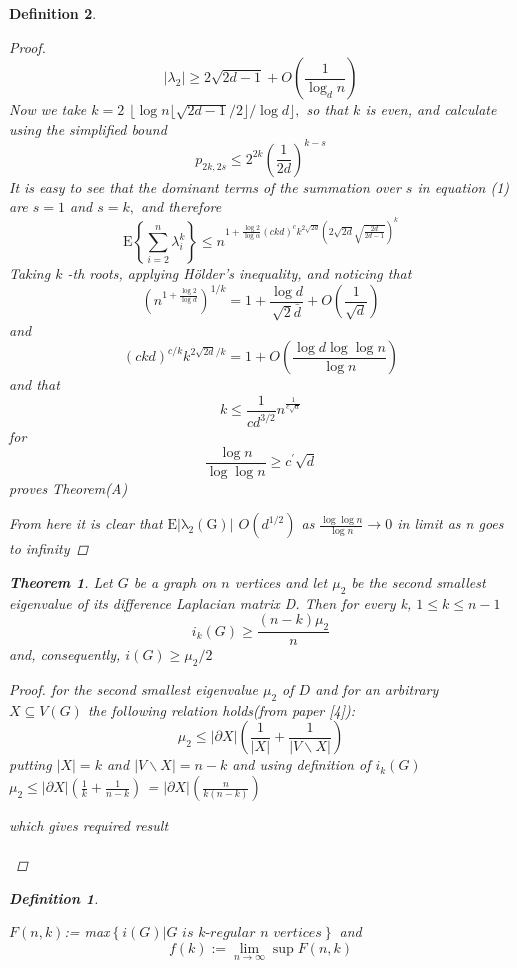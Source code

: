 \documentclass[oneside]{book}
\newtheorem{theorem}{Theorem}[section]
\newtheorem{mydef}{Definition}
\begin{document}
\begin{mydef}
\begin{proof}
$$
\left|\lambda_{2}\right| \geq 2 \sqrt{2 d-1}+O\left(\frac{1}{\log _{d} n}\right)
$$
Now we take $k=2$ $\lfloor\log n\lfloor\sqrt{2 d-1} / 2\rfloor / \log d\rfloor,$ so that $k$ is even, and calculate
using the simplified bound
$$
p_{2 k, 2 s} \leq 2^{2 k}\left(\frac{1}{2 d}\right)^{k-s}
$$
It is easy to see that the dominant terms of the summation over $s$ in equation (1) are $s=1$ and $s=k,$ and therefore
$$
\mathrm{E}\left\{\sum_{i=2}^{n} \lambda_{i}^{k}\right\} \leq n^{1+\frac{\log 2}{\log \alpha}(c k d)^{c} k^{2 \sqrt{2 d}}(2 \sqrt{2 d} \sqrt{\frac{2 d}{2 d-1}})^{k}}
$$
Taking $k$ -th roots, applying Hölder's  inequality, and noticing that
$$
\left(n^{1+\frac{\log 2}{\log d}}\right)^{1 / k}=1+\frac{\log d}{\sqrt{2} \bar{d}}+O\left(\frac{1}{\sqrt{d}}\right)
$$
and 
$$
(c k d)^{c / k} k^{2 \sqrt{2 d} / k}=1+O\left(\frac{\log d \log \log n}{\log n}\right)
$$
and that
$$
k \leq \frac{1}{c d^{3 / 2}} n^{\frac{1}{c \sqrt{a}}}
$$
for
$$
\frac{\log n}{\log \log n} \geq c^{\prime} \sqrt{d}
$$
proves Theorem(A)  \par 
From here it is clear that $\mathrm{E|\lambda_{2}(G)|}$ \leq $O(d^{1/2})$ as $\frac{ \log \log n}{\log n}\rightarrow 0$ in limit  as n goes to  infinity 
\end{proof} 
\begin{theorem} 
\label{t:14}
 Let $G$ be a graph on $n$ vertices and let $\mu_{2}$ be the second smallest eigenvalue of its difference Laplacian matrix D. Then for every k, 
$1 \leq k \leq n-1$
$$
i_{k}(G) \geq \frac{(n-k) \mu_{2}}{n}
$$
and, consequently, $i(G) \geq \mu_{2} / 2$ \par
\end{theorem} 
\begin{proof}
for the second smallest eigenvalue $\mu_{2}$ of $D$ and for an arbitrary $X \subseteq V(G)$ the following relation holds(from paper [4]):
$$
\mu_{2} \leq|\partial X|\left(\frac{1}{|X|}+\frac{1}{|V \backslash X|}\right)
$$
putting $|X| = k $ and $|V\backslash X| = n-k $ and using definition of $i_k(G)$ 
 $ \mu_{2} \leq|\partial X|\left(\frac{1}{k}+\frac{1}{n-k}\right)$ = $|\partial X|\left(\frac{n}{k(n-k)}\right) $ \par
 which gives required result\\\\
 \end{proof} 
 
 \begin{mydef} \label{d:19}
 
 
$F(n, k)$:= max$\left\{i(G)| \textit{G is k-regular  n vertices} \right\}$ 
and
$$
f(k):=\lim _{n \rightarrow \infty} \sup F(n, k)
$$
\end{mydef}
 

\end{mydef}
\end{document}
